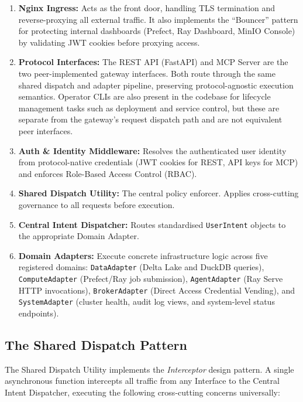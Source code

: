 \documentclass[12pt, a4paper]{report}
\begin{document}
\begin{enumerate}
  \item \textbf{Nginx Ingress:} Acts as the front door, handling TLS termination and
  reverse-proxying all external traffic. It also implements the ``Bouncer'' pattern for
  protecting internal dashboards (Prefect, Ray Dashboard, MinIO Console) by validating
  JWT cookies before proxying access.
  \item \textbf{Protocol Interfaces:} The REST API (FastAPI) and MCP Server are the
  two peer-implemented gateway interfaces. Both route through the same shared dispatch
  and adapter pipeline, preserving protocol-agnostic execution semantics. Operator
  CLIs are also present in the codebase for lifecycle management tasks such as
  deployment and service control, but these are separate from the gateway's request
  dispatch path and are not equivalent peer interfaces.
  \item \textbf{Auth \& Identity Middleware:} Resolves the authenticated user identity
  from protocol-native credentials (JWT cookies for REST, API keys for MCP) and
  enforces Role-Based Access Control (RBAC).
  \item \textbf{Shared Dispatch Utility:} The central policy enforcer. Applies
  cross-cutting governance to all requests before execution.
  \item \textbf{Central Intent Dispatcher:} Routes standardised \texttt{UserIntent}
  objects to the appropriate Domain Adapter.
  \item \textbf{Domain Adapters:} Execute concrete infrastructure logic across five
  registered domains: \texttt{DataAdapter} (Delta Lake and DuckDB queries),
  \texttt{ComputeAdapter} (Prefect/Ray job submission), \texttt{AgentAdapter}
  (Ray Serve HTTP invocations), \texttt{BrokerAdapter} (Direct Access Credential
  Vending), and \texttt{SystemAdapter} (cluster health, audit log views, and
  system-level status endpoints).
\end{enumerate}

\subsection{The Shared Dispatch Pattern}
\label{ssec:shared_dispatch}

The Shared Dispatch Utility implements the \emph{Interceptor} design pattern.
A single asynchronous function intercepts all traffic from any Interface to the Central
Intent Dispatcher, executing the following cross-cutting concerns universally:
\end{document}
